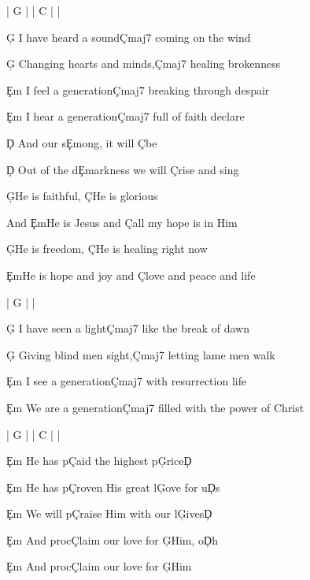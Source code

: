 \documentclass[9pt]{extarticle}
\begin{document}
\bsong

\bi
| G |  | C |  |
\ei

\bv
\c{G} I have heard a sound\c{Cmaj7} coming on the wind

\c{G} Changing hearts and minds,\c{Cmaj7} healing brokenness

\c{Em} I feel a generation\c{Cmaj7} breaking through despair

\c{Em} I hear a generation\c{Cmaj7} full of faith declare
\ev

\bp
\c{D} And our s\c{Em}ong, it will \c{C}be

\c{D} Out of the d\c{Em}arkness we will \c{C}rise and sing
\ep

\bc
\c{G}He is faithful, \c{C}He is glorious

And \c{Em}He is Jesus and \c{C}all my hope is in Him

\c{G}He is freedom, \c{C}He is healing right now

\c{Em}He is hope and joy and \c{C}love and peace and life
\ec

\bin
| G |  |
\ein

\bv
\c{G} I have seen a light\c{Cmaj7} like the break of dawn

\c{G} Giving blind men sight,\c{Cmaj7} letting lame men walk

\c{Em} I see a generation\c{Cmaj7} with resurrection life

\c{Em} We are a generation\c{Cmaj7} filled with the power of Christ
\ev



\bin
| G |  | C |  |
\ein

\bb[2]
\c{Em} He has p\c{C}aid the highest p\c{G}rice\c{D}

\c{Em} He has p\c{C}roven His great l\c{G}ove for u\c{D}s

\c{Em} We will p\c{C}raise Him with our l\c{G}ives\c{D}

\c{Em} And proc\c{C}laim our love for \c{G}Him, o\c{D}h
\eb

\bt
\c{Em} And proc\c{C}laim our love for \c{G}Him
\et

\esong
\end{document}
